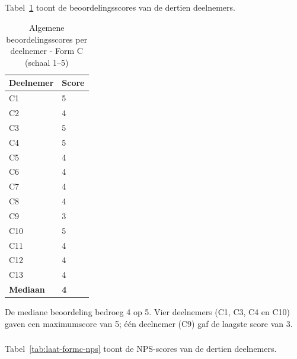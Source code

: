 \subsection{}

\subsubsection{}

Tabel~\ref{tab:laat-formc-ratings} toont de beoordelingsscores van de dertien deelnemers.

\begin{table}[h]
  \centering
  \caption[Algemene beoordelingsscores late test Form C]{Algemene beoordelingsscores per deelnemer - Form C (schaal 1–5)}
  \label{tab:laat-formc-ratings}
  \begin{tabular}{ll}
    \hline
    \textbf{Deelnemer} & \textbf{Score} \\
    \hline
    C1  & 5 \\
    C2  & 4 \\
    C3  & 5 \\
    C4  & 5 \\
    C5  & 4 \\
    C6  & 4 \\
    C7  & 4 \\
    C8  & 4 \\
    C9  & 3 \\
    C10 & 5 \\
    C11 & 4 \\
    C12 & 4 \\
    C13 & 4 \\
    \hline
    \textbf{Mediaan} & \textbf{4} \\
    \hline
  \end{tabular}
\end{table}

De mediane beoordeling bedroeg 4 op 5. Vier deelnemers (C1, C3, C4 en C10) gaven een maximumscore van 5; één deelnemer (C9) gaf de laagste score van 3.

\subsubsection{}

Tabel~\ref{tab:laat-formc-nps} toont de NPS-scores van de dertien deelnemers.

